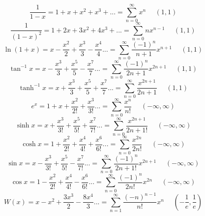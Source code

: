\documentclass[12pt]{article}
\numberwithin{equation}{subsection}
\newcommand{\lnp}[1]{\ln\left( #1 \right)}
\begin{document}
\begin{equation}
\frac{1}{1-x}=1+x+x^{2}+x^{3}+...=\sum_{n=0}^{\infty}x^{n}\ \ \ \ \ \ (1,1)
\end{equation}
\begin{equation}
\frac{1}{(1-x)^{2}}=1+2x+3x^{2}+4x^{3}+...=\sum_{n=0}^{\infty}nx^{n-1}\ \ \ \ \ \ (1,1)
\end{equation}
\begin{equation}
\lnp{1+x}=x-\frac{x^{2}}{2}+\frac{x^{3}}{3}-\frac{x^{4}}{4}...=\sum_{n=0}^{\infty}\frac{(-1)^{n}}{n+1}x^{n+1}\ \ \ \ \ \ (1,1)
\end{equation}
\begin{equation}
\tan^{-1}{x}=x-\frac{x^{3}}{3}+\frac{x^{5}}{5}-\frac{x^{7}}{7}...=\sum_{n=0}^{\infty}\frac{(-1)^{n}}{2n+1}x^{2n+1}\ \ \ \ \ \ (1,1)
\end{equation}
\begin{equation}
\tanh^{-1}{x}=x+\frac{x^{3}}{3}+\frac{x^{5}}{5}+\frac{x^{7}}{7}...=\sum_{n=0}^{\infty}\frac{x^{2n+1}}{2n+1}\ \ \ \ \ \ (1,1)
\end{equation}
\begin{equation}
e^{x}=1+x+\frac{x^{2}}{2!}+\frac{x^{3}}{3!}...=\sum_{n=0}^{\infty}\frac{x^{n}}{n!}\ \ \ \ \ \ (-\infty,\infty)
\end{equation}
\begin{equation}
\sinh{x}=x+\frac{x^{3}}{3!}+\frac{x^{5}}{5!}+\frac{x^{7}}{7!}...=\sum_{n=0}^{\infty}\frac{x^{2n+1}}{2n+1!}\ \ \ \ \ \ (-\infty,\infty)
\end{equation}
\begin{equation}
\cosh{x}=1+\frac{x^{2}}{2!}+\frac{x^{4}}{4!}+\frac{x^{6}}{6!}...=\sum_{n=0}^{\infty}\frac{x^{2n}}{2n!}\ \ \ \ \ \ (-\infty,\infty)
\end{equation}
\begin{equation}
\sin{x}=x-\frac{x^{3}}{3!}+\frac{x^{5}}{5!}-\frac{x^{7}}{7!}...=\sum_{n=0}^{\infty}\frac{(-1)^{n}}{2n+1!}x^{2n+1}\ \ \ \ \ \ (-\infty,\infty)
\end{equation}
\begin{equation}
\cos{x}=1-\frac{x^{2}}{2!}+\frac{x^{4}}{4!}-\frac{x^{6}}{6!}...=\sum_{n=0}^{\infty}\frac{(-1)^{n}}{2n!}x^{2n}\ \ \ \ \ \ (-\infty,\infty)
\end{equation}
\begin{equation}
W(x)=x-x^{2}+\frac{3x^{3}}{2}-\frac{8x^{4}}{3}...=\sum_{n=1}^{\infty}\frac{(-n)^{n-1}}{n!}x^{n}\ \ \ \ \ \ \left(-\frac{1}{e},\frac{1}{e}\right)
\end{equation}
\end{document}
